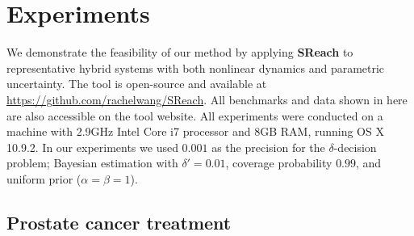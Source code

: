 \section{Experiments}


We demonstrate the feasibility of our method by applying {\bf SReach} to representative hybrid systems with both nonlinear dynamics and parametric uncertainty. 
The tool is open-source and available at \url{https://github.com/rachelwang/SReach}. 
All benchmarks and data shown in here are also accessible on the tool website. All experiments were conducted on a machine with 2.9GHz Intel Core i7 processor and 8GB RAM, running OS X 10.9.2. 
In our experiments we used $0.001$ as the precision for the $\delta$-decision problem; Bayesian estimation
with $\delta' = 0.01$, coverage probability $0.99$, and uniform prior ($\alpha = \beta = 1$). 


\subsection{Prostate cancer treatment}

